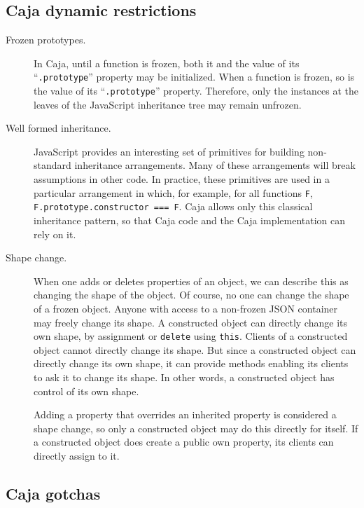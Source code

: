 \documentclass[letterpaper,twocolumn,10pt]{article}
\newcommand{\code}[1]{{\tt {#1}}}              %
\begin{document}
\subsection{Caja dynamic restrictions}

\begin{description}

  \item[Frozen prototypes.] In Caja, until a function is frozen, both it and 
  the value of its ``\code{.prototype}'' property may be initialized. When a 
  function is frozen, so is the value of its ``\code{.prototype}'' property. 
  Therefore, only the instances at the leaves of the JavaScript inheritance 
  tree may remain unfrozen.
  
   \item[Well formed inheritance.] JavaScript provides an interesting set of 
   primitives for building non-standard inheritance arrangements. Many of 
   these arrangements will break assumptions in other code. In practice, 
   these primitives are used in a particular arrangement in which, for 
   example, for all functions \code{F}, \code{F.prototype.constructor === F}. 
   Caja allows only this classical inheritance pattern, so that Caja code and 
   the Caja implementation can rely on it.
   
   \item[Shape change.] When one adds or deletes properties of an object, we 
   can describe this as changing the shape of the object. Of course, no one 
   can change the shape of a frozen object. Anyone with access to a 
   non-frozen JSON container may freely change its shape. A constructed 
   object can directly change its own shape, by assignment or \code{delete} 
   using \code{this}. Clients of a constructed object cannot directly change 
   its shape. But since a constructed object can directly change its own 
   shape, it can provide methods enabling its clients to ask it to change its 
   shape. In other words, a constructed object has control of its own shape.
   
   Adding a property that overrides an inherited property is considered a 
   shape change, so only a constructed object may do this directly for 
   itself. If a constructed object does create a public own property, its 
   clients can directly assign to it.
  
\end{description}


\subsection{Caja gotchas}
\end{document}

